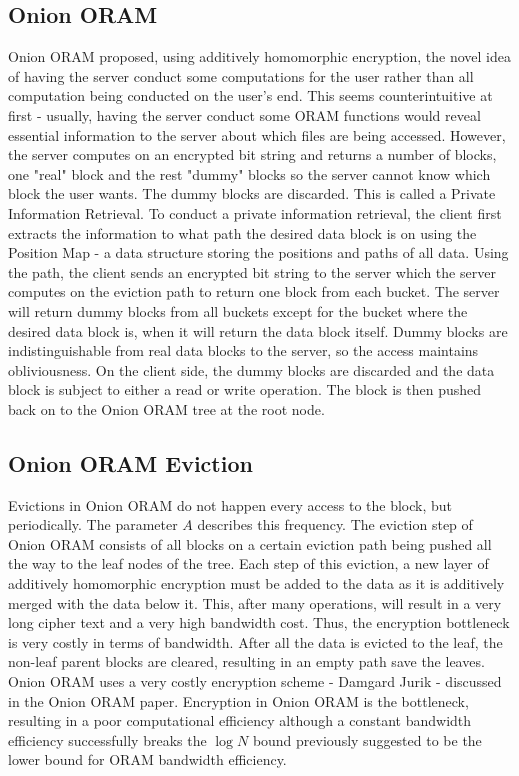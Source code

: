 \documentclass[12pt, oneside]{article}   	%
\begin{document}
\subsection{Onion ORAM}
Onion ORAM proposed, using additively homomorphic encryption, the novel idea of having the server conduct some computations for the user rather than all computation being conducted on the user's end. This seems counterintuitive at first - usually, having the server conduct some ORAM functions would reveal essential information to the server about which files are being accessed. However, the server computes on an encrypted bit string and returns a number of blocks, one "real" block and the rest "dummy" blocks so the server cannot know which block the user wants. The dummy blocks are discarded. This is called a Private Information Retrieval. To conduct a private information retrieval, the client first extracts the information to what path the desired data block is on using the Position Map - a data structure storing the positions and paths of all data. Using the path, the client sends an encrypted bit string to the server which the server computes on the eviction path to return one block from each bucket. The server will return dummy blocks from all buckets except for the bucket where the desired data block is, when it will return the data block itself. Dummy blocks are indistinguishable from real data blocks to the server, so the access maintains obliviousness. On the client side, the dummy blocks are discarded and the data block is subject to either a read or write operation. The block is then pushed back on to the Onion ORAM tree at the root node. 

\subsection{Onion ORAM Eviction}
Evictions in Onion ORAM do not happen every access to the block, but periodically. The parameter $A$ describes this frequency. The eviction step of Onion ORAM consists of all blocks on a certain eviction path being pushed all the way to the leaf nodes of the tree. Each step of this eviction, a new layer of additively homomorphic encryption must be added to the data as it is additively merged with the data below it. This, after many operations, will result in a very long cipher text and a very high bandwidth cost. Thus, the encryption bottleneck is very costly in terms of bandwidth. After all the data is evicted to the leaf, the non-leaf parent blocks are cleared, resulting in an empty path save the leaves. Onion ORAM uses a very costly encryption scheme - Damgard Jurik - discussed in the Onion ORAM paper. Encryption in Onion ORAM is the bottleneck, resulting in a poor computational efficiency although a constant bandwidth efficiency successfully breaks the $\log N$ bound previously suggested to be the lower bound for ORAM bandwidth efficiency.
\end{document}
